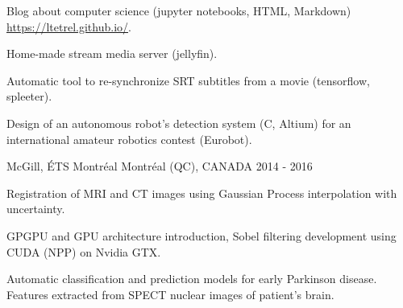 


\begin{cventries}


\cventry
{} %
{} %
{} %
{} %
{ %
\vspace{-5mm}
\begin{cvitems}
\item {Blog about computer science (jupyter notebooks, HTML, Markdown) \url{https://ltetrel.github.io/}.}
\item {Home-made stream media server (jellyfin).}
\item {Automatic tool to re-synchronize SRT subtitles from a movie (tensorflow, spleeter).}
\item{Design of an autonomous robot's detection system (C, Altium) for an international amateur robotics contest (Eurobot).}
\end{cvitems}
}


\cventry
{} %
{McGill, ÉTS Montréal} %
{\hspace{-5mm}Montréal (QC), CANADA} %
{2014 - 2016} %
{ %
\vspace{-5mm}
\begin{cvitems}
\item {Registration of MRI and CT images using Gaussian Process interpolation with uncertainty.}
\item {GPGPU and GPU architecture introduction, Sobel filtering development using CUDA (NPP) on Nvidia GTX.}
\item {Automatic classification and prediction models for early Parkinson disease. Features extracted from SPECT nuclear images of patient's brain.}
\end{cvitems}
}


\end{cventries}
